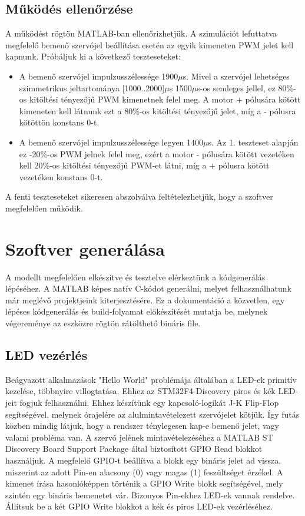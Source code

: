 \subsection{Működés ellenőrzése}

A működést rögtön MATLAB-ban ellenőrizhetjük. A szimulációt lefuttatva megfelelő bemenő szervójel beállítása esetén az egyik kimeneten PWM jelet kell kapnunk.
Próbáljuk ki a következő teszteseteket:
\begin{itemize}
	\item A bemenő szervójel impulzusszélessége 1900$\mu$s. Mivel a szervójel lehetséges szimmetrikus jeltartománya [1000..2000]$\mu$s 1500$\mu$s-os semleges jellel, ez 80\%-os kitöltési tényezőjű PWM kimenetnek felel meg. A motor + pólusára kötött kimeneten kell látnunk ezt a 80\%-os kitöltési tényezőjű jelet, míg a - pólusra kötöttön konstans 0-t.
	
	\item A bemenő szervójel impulzusszélessége legyen 1400$\mu$s. Az 1. teszteset alapján ez -20\%-os PWM jelnek felel meg, ezért a motor - pólusára kötött vezetéken kell 20\%-os kitöltési tényezőjű PWM-et látni, míg a + pólusra kötött vezetéken konstans 0-t.
	
\end{itemize}

A fenti teszteseteket sikeresen abszolválva feltételezhetjük, hogy a szoftver megfelelően működik.

\section{Szoftver generálása}

A modellt megfelelően elkészítve és tesztelve elérkeztünk a kódgenerálás lépéséhez. A MATLAB képes natív C-kódot generálni, melyet felhasználhatunk már meglévő projektjeink kiterjesztésére. Ez a dokumentáció a közvetlen, egy lépéses kódgenerálás és build-folyamat előkészítését mutatja be, melynek végereménye az eszközre rögtön rátölthető bináris file.

\subsection{LED vezérlés}

Beágyazott alkalmazások "Hello World" problémája általában a LED-ek primitív kezelése, többnyire villogtatása. Ehhez az STM32F4-Discovery piros és kék LED-jeit fogjuk felhasználni. Ehhez készítünk egy kapcsoló-logikát J-K Flip-Flop segítségével, melynek órajelére az alulmintavételezett szervójelet kötjük. Így futás közben mindig látjuk, hogy a rendszer ténylegesen kap-e bemenő jelet, vagy valami probléma van.
A szervó jelének mintavételezéséhez a MATLAB ST Discovery Board Support Package által biztosított GPIO Read blokkot használjuk. A megfelelő GPIO-t beállítva a blokk egy bináris jelet ad vissza, miszerint az adott Pin-en alacsony (0) vagy magas (1) feszültséget érzékel. A kimenet írása hasonlóképpen történik a GPIO Write blokk segítségével, mely szintén egy bináris bemenetet vár. Bizonyos Pin-ekhez LED-ek vannak rendelve\cite[sec.~4.4]{discoverymanual}. Állítsuk be a két GPIO Write blokkot a kék és piros LED-ek vezérléséhez.

